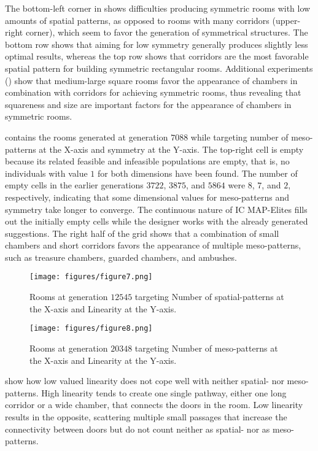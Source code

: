 \documentclass[conference]{IEEEtran}
\begin{document}
The bottom-left corner in  shows difficulties producing symmetric rooms with low amounts of spatial patterns, as opposed to rooms with many corridors (upper-right corner), which seem to favor the generation of symmetrical structures. The bottom row shows that aiming for low symmetry generally produces slightly less optimal results, whereas the top row shows that corridors are the most favorable spatial pattern for building symmetric rectangular rooms. Additional experiments () show that medium-large square rooms favor the appearance of chambers in combination with corridors for achieving symmetric rooms, thus revealing that squareness and size are important factors for the appearance of chambers in symmetric rooms.

 contains the rooms generated at generation $7088$ while targeting number of meso-patterns at the X-axis and symmetry at the Y-axis. The top-right cell is empty because its related feasible and infeasible populations are empty, that is, no individuals with value $1$ for both dimensions have been found. The number of empty cells in the earlier generations $3722$, $3875$, and $5864$ were $8$, $7$, and $2$, respectively, indicating that some dimensional values for meso-patterns and symmetry take longer to converge. The continuous nature of IC MAP-Elites fills out the initially empty cells while the designer works with the already generated suggestions. The right half of the grid shows that a combination of small chambers and short corridors favors the appearance of multiple meso-patterns, such as treasure chambers, guarded chambers, and ambushes.

\begin{figure}[ht!]
\centerline{\texttt{[image: figures/figure7.png]}}
\caption{Rooms at generation $12545$ targeting Number of spatial-patterns at the X-axis and Linearity at the Y-axis.}
\label{figs:lin_patt}
\end{figure}

\begin{figure}[ht!]
\centerline{\texttt{[image: figures/figure8.png]}}
\caption{Rooms at generation $20348$ targeting Number of meso-patterns at the X-axis and Linearity at the Y-axis.}
\label{figs:lin_meso}
\end{figure}

 show how low valued linearity does not cope well with neither spatial- nor meso-patterns. High linearity tends to create one single pathway, either one long corridor or a wide chamber, that connects the doors in the room. Low linearity results in the opposite, scattering multiple small passages that increase the connectivity between doors but do not count neither as spatial- nor as meso-patterns.
\end{document}
